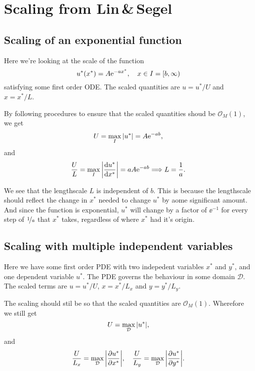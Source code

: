 \documentclass[11pt,letter, swedish, english
]{article}
\begin{document}
\section{Scaling from Lin\,\&\,Segel}
\setcounter{subsection}{1}
\renewcommand{\thesubsection}{L\&S 6.3: \arabic{subsection}}
\subsection{Scaling of an exponential function}
Here we're looking at the scale of the function
\begin{equation}
u^*(x^*)=A\ee^{-ax^*}\qcomma x\in I=[b, \infty)
\end{equation}
satisfying some first order ODE. The scaled quantities are $u=u^*/U$
and $x=x^*/L$. 

By following procedures to ensure that the scaled quantities shoud be
$\mathcal{O}_M(1)$, we get
\begin{equation}
U=\max_I\abs{u^*}=A\mathrm{e}^{-ab},
\end{equation}
and 
\begin{equation}
\frac{U}{L}=\max_I\abs{\dv{u^*}{x^*}}=aA\mathrm{e}^{-ab} \Longrightarrow
L=\frac{1}{a}.
\end{equation}

We see that the lengthscale $L$ is independent of $b$. This is because
the lengthscale should reflect the change in $x^*$ needed to change
$u^*$ by aome significant amount. And since the function is
exponential, $u^*$ will change by a factor of $\ee^{-1}$ for every
step of $\nicefrac{1}{a}$ that $x^*$ takes, regardless of where $x^*$
had it's origin. 

\subsection{Scaling with multiple independent variables}
Here we have some first order PDE with two indepedent variables $x^*$
and $y^*$, and one dependent variable $u^*$. The PDE governs the
behaviour in some domain $\mathcal{D}$. The scaled terms are
$u=u^*/U$, $x=x^*/L_x$ and $y=y^*/L_y$.

The scaling should stil be so that the scaled quantities are
$\mathcal{O}_M(1)$. Wherefore we still get
\begin{equation}
U=\max_\mathcal{D}\abs{u^*},
\end{equation}
and
\begin{equation}
\frac{U}{L_x}=\max_\mathcal{D}\abs{\pdv{u^*}{x^*}}\qcomma
\frac{U}{L_y}=\max_\mathcal{D}\abs{\pdv{u^*}{y^*}}.
\end{equation}
\end{document}
